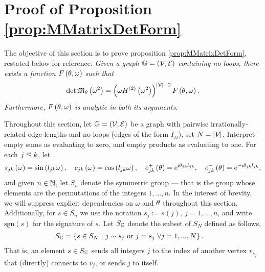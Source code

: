 \section{Proof of Proposition \ref{prop:MMatrixDetForm}} \label{sec:ProofOfProp}
The objective of this section is to prove proposition \ref{prop:MMatrixDetForm}, restated below for reference. \newline
\textit{ Given a graph $\mathbb{G} = \left( \mathcal{V}, \mathcal{E} \right)$ containing no loops, there exists a function $F\left( \theta,\omega \right)$ such that
\begin{align*}
	\det\mathfrak{M}_\theta\left( \omega^2 \right) = \left(  \omega H^{(2)}\left( \omega^2 \right)  \right)^{\left\lvert \mathcal{V} \right\rvert-2} F\left( \theta,\omega \right).
\end{align*}
Furthermore, $F\left( \theta,\omega \right)$ is analytic in both its arguments. } \newline

Throughout this section, let $\mathbb{G}=\left( \mathcal{V}, \mathcal{E} \right)$ be a graph with pairwise irrationally-related edge lengths and no loops (edges of the form $I_{jj}$), set $N=\left\lvert \mathcal{V} \right\rvert$.
Interpret empty sums as evaluating to zero, and empty products as evaluating to one.
For each $j\conLeft k$, let
\begin{align*}
	s_{jk}\left( \omega \right) = \sin\left( l_{jk}\omega \right), \quad
	c_{jk}\left( \omega \right) = \cos\left( l_{jk}\omega \right), \quad
	e_{jk}^+\left( \theta \right) = \mathrm{e}^{\mathrm{i}\theta_{jk}l_{jk}}, \quad
	e_{jk}^-\left( \theta \right) = \mathrm{e}^{-\mathrm{i}\theta_{jk}l_{jk}},
\end{align*}
and given $n\in\mathbb{N}$, let $S_n$ denote the symmetric group --- that is the group whose elements are the permutations of the integers $1, ..., n$.
In the interest of brevity, we will suppress explicit dependencies on $\omega$ and $\theta$ throughout this section.
Additionally, for $s\in S_n$ we use the notation $s_j := s(j), \ j=1,...,n$, and write $\mathrm{sgn}(s)$ for the signature of $s$.
Let $S_{\mathbb{G}}$ denote the subset of $S_N$ defined as follows,
\begin{align*}
	S_{\mathbb{G}} &= \left\{  s\in S_N \ \middle\vert \  j\sim s_j \text{ or } j=s_j \ \forall j=1,...,N \right\}.
\end{align*}
That is, an element $s\in S_{\mathbb{G}}$ sends all integers $j$ to the index of another vertex $v_{s_j}$ that (directly) connects to $v_j$, or sends $j$ to itself.


